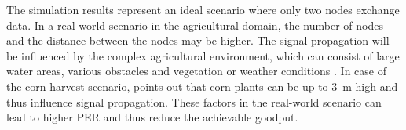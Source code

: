 The simulation results represent an ideal scenario where only two nodes exchange data. 
In a real-world scenario in the agricultural domain, the number of nodes and the distance between the nodes may be higher.
The signal propagation will be influenced by the complex agricultural environment,
which can consist of large water areas, various obstacles and vegetation or weather conditions \cite{brinkhoff_characterization_2017}.
In case of the corn harvest scenario, \textcite{smolnik_5g_2020} points out that corn plants can be up to \SI{3}{\metre} high
and thus influence signal propagation.
These factors in the real-world scenario can lead to higher \ac{PER} and thus reduce the achievable goodput.

